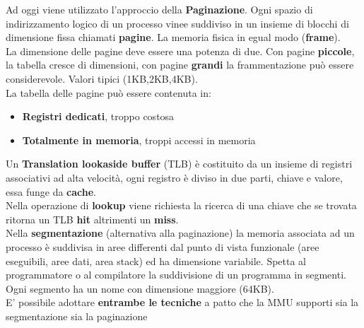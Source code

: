 \documentclass{article}
\begin{document}
Ad oggi viene utilizzato l'approccio della \textbf{Paginazione}. Ogni spazio di indirizzamento logico di un processo vinee suddiviso in un insieme di blocchi di dimensione fissa chiamati \textbf{pagine}. La memoria fisica in egual modo (\textbf{frame}).\\
La dimensione delle pagine deve essere una potenza di due. Con pagine \textbf{piccole}, la tabella cresce di dimensioni, con pagine \textbf{grandi} la frammentazione può essere considerevole. Valori tipici (1KB,2KB,4KB). \\
La tabella delle pagine può essere contenuta in:
\begin{itemize}
  \item \textbf{Registri dedicati}, troppo costosa
  \item \textbf{Totalmente in memoria}, troppi accessi in memoria
\end{itemize}
Un \textbf{Translation lookaside buffer} (TLB) è costituito da un insieme di registri associativi ad alta velocità, ogni registro è diviso in due parti, chiave e valore, essa funge da \textbf{cache}.\\
Nella operazione di \textbf{lookup} viene richiesta la ricerca di una chiave che se trovata ritorna un TLB \textbf{hit} altrimenti un \textbf{miss}.\\
Nella \textbf{segmentazione} (alternativa alla paginazione) la memoria associata ad un processo è suddivisa in aree differenti dal punto di vista funzionale (aree eseguibili, aree dati, area stack) ed ha dimensione variabile. Spetta al programmatore o al compilatore la suddivisione di un programma in segmenti. Ogni segmento ha un nome con dimensione maggiore (64KB).\\
E' possibile adottare \textbf{entrambe le tecniche} a patto che la MMU supporti sia la segmentazione sia la paginazione
\end{document}
